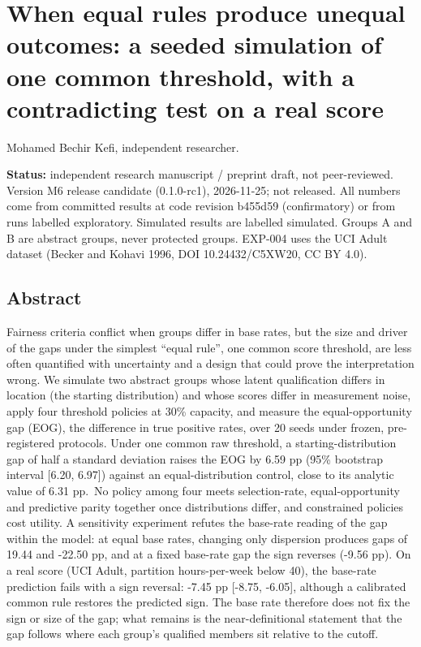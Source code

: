 \documentclass[
]{article}
\author{}
\date{}
\begin{document}
\section{When equal rules produce unequal outcomes: a seeded simulation
of one common threshold, with a contradicting test on a real
score}\label{when-equal-rules-produce-unequal-outcomes-a-seeded-simulation-of-one-common-threshold-with-a-contradicting-test-on-a-real-score}

Mohamed Bechir Kefi, independent researcher.

\textbf{Status:} independent research manuscript / preprint draft, not
peer-reviewed. Version M6 release candidate (0.1.0-rc1), 2026-11-25; not
released. All numbers come from committed results at code revision
b455d59 (confirmatory) or from runs labelled exploratory. Simulated
results are labelled simulated. Groups A and B are abstract groups,
never protected groups. EXP-004 uses the UCI Adult dataset (Becker and
Kohavi 1996, DOI 10.24432/C5XW20, CC BY 4.0).

\subsection{Abstract}\label{abstract}

Fairness criteria conflict when groups differ in base rates, but the
size and driver of the gaps under the simplest ``equal rule'', one
common score threshold, are less often quantified with uncertainty and a
design that could prove the interpretation wrong. We simulate two
abstract groups whose latent qualification differs in location (the
starting distribution) and whose scores differ in measurement noise,
apply four threshold policies at 30\% capacity, and measure the
equal-opportunity gap (EOG), the difference in true positive rates, over
20 seeds under frozen, pre-registered protocols. Under one common raw
threshold, a starting-distribution gap of half a standard deviation
raises the EOG by 6.59 pp (95\% bootstrap interval {[}6.20, 6.97{]})
against an equal-distribution control, close to its analytic value of
6.31 pp.~No policy among four meets selection-rate, equal-opportunity
and predictive parity together once distributions differ, and
constrained policies cost utility. A sensitivity experiment refutes the
base-rate reading of the gap within the model: at equal base rates,
changing only dispersion produces gaps of 19.44 and -22.50 pp, and at a
fixed base-rate gap the sign reverses (-9.56 pp). On a real score (UCI
Adult, partition hours-per-week below 40), the base-rate prediction
fails with a sign reversal: -7.45 pp {[}-8.75, -6.05{]}, although a
calibrated common rule restores the predicted sign. The base rate
therefore does not fix the sign or size of the gap; what remains is the
near-definitional statement that the gap follows where each group's
qualified members sit relative to the cutoff.
\end{document}
